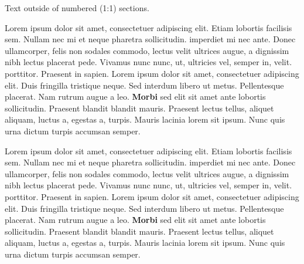 \documentclass{memoir}
\begin{document}
\setcounter{page}{637}
Text outside of numbered (1:1) sections.
\newpage
\begin{pairs}
\begin{Leftside}
\beginnumbering
\pstart
Lorem ipsum dolor sit amet, consectetuer adipiscing elit. Etiam
lobortis facilisis sem. Nullam nec mi et neque pharetra
sollicitudin.  imperdiet mi nec ante. Donec ullamcorper,
felis non sodales commodo, lectus velit ultrices augue, a
dignissim nibh lectus placerat pede. Vivamus nunc nunc, 
ut, ultricies vel, semper in, velit.  porttitor. Praesent in
sapien. Lorem ipsum dolor sit amet, consectetuer adipiscing elit.
Duis fringilla tristique neque. Sed interdum libero ut metus.
Pellentesque placerat. Nam rutrum augue a leo. \textbf{Morbi} sed elit sit
amet ante lobortis sollicitudin. Praesent blandit blandit mauris.
Praesent lectus tellus, aliquet aliquam, luctus a, egestas a,
turpis. Mauris lacinia lorem sit ipsum. Nunc quis urna dictum
turpis accumsan semper.
\pend
\endnumbering
\end{Leftside}
\begin{Rightside}
\beginnumbering
\pstart
Lorem ipsum dolor sit amet, consectetuer adipiscing elit. Etiam
lobortis facilisis sem. Nullam nec mi et neque pharetra
sollicitudin.  imperdiet mi nec ante. Donec ullamcorper,
felis non sodales commodo, lectus velit ultrices augue, a
dignissim nibh lectus placerat pede. Vivamus nunc nunc, 
ut, ultricies vel, semper in, velit.  porttitor. Praesent in
sapien. Lorem ipsum dolor sit amet, consectetuer adipiscing elit.
Duis fringilla tristique neque. Sed interdum libero ut metus.
Pellentesque placerat. Nam rutrum augue a leo. \textbf{Morbi} sed elit sit
amet ante lobortis sollicitudin. Praesent blandit blandit mauris.
Praesent lectus tellus, aliquet aliquam, luctus a, egestas a,
turpis. Mauris lacinia lorem sit ipsum. Nunc quis urna dictum
turpis accumsan semper.
\pend
\endnumbering
\end{Rightside}
\end{pairs}
\Columns
\printindex
\end{document}
